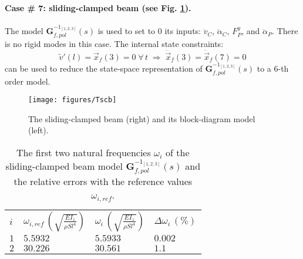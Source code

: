 \FloatBarrier
\paragraph{Case \# 7: sliding-clamped beam (see Fig. \ref{fig:Tsc}).} The model $\mathbf{G}_{f,pol}^{-1_{[1,2,3]}}(s)$ is used to set to $0$ its inputs: $\ddot{v}_C$, $\ddot{\alpha}_C$, $F^y_P$, and $\ddot{\alpha}_P$. There is no rigid modes in this case. The internal state constraints:
\[
\widetilde{v}'(l)=\vec{x}_f(3)=0\;\forall\,t\;\Rightarrow\;\dot{\vec{x}}_f(3)=\dot{\vec{x}}_f(7)=0
\]
can be used to reduce the state-space representation of $\mathbf{G}_{f,pol}^{-1_{[1,2,3]}}(s)$ to a $6$-th order model.
\begin{figure}[htbp!]
  \texttt{[image: figures/Tscb]}
\caption{The sliding-clamped beam (right) and its block-diagram model (left).}
\label{fig:Tsc} 
\end{figure}
\begin{table}[htbp!]
\caption{The first two natural frequencies $\omega_i$ of the sliding-clamped beam model $\mathbf{G}_{f,pol}^{-1_{[1,2,3]}}(s)$ and the relative errors with the reference values $\omega_{i,ref}$.}
\label{tab:Tsc}       %

\begin{tabular}{llll}
\hline\noalign{\smallskip}
  $i$ & $\omega_{i,ref}\,\left(\sqrt{\frac{EI_z}{\rho S l^4}}\right)$ &  $\omega_i\,\left(\sqrt{\frac{EI_z}{\rho S l^4}}\right)$ &  $\Delta \omega_i\,(\%)$ \\
\noalign{\smallskip}\hline\noalign{\smallskip}
$1$ & $5.5932$ & $5.5933$  & $0.002$ \\ 
$2$ & $30.226$ & $30.561$ & $1.1$ \\
\hline
\end{tabular}
\end{table}

\FloatBarrier
